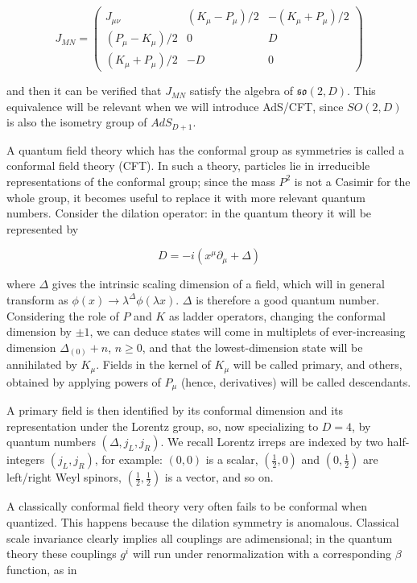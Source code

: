 \begin{equation}
	J_{MN} = 
	\begin{pmatrix}
		J_{\mu\nu} 		& (K_\mu - P_\mu)/2	& - (K_\mu+P_\mu)/2 \\
		(P_\mu - K_\mu)/2	& 0			& D \\
		(K_\mu+P_\mu)/2		& -D			& 0
	\end{pmatrix}
	\label{}
\end{equation}

and then it can be verified that $J_{MN}$ satisfy the algebra of $\mathfrak{so}(2,D)$. This equivalence will be relevant when we will introduce AdS/CFT, since $SO(2,D)$ is also the isometry group of $AdS_{D+1}$.

A quantum field theory which has the conformal group as symmetries is called a conformal field theory (CFT). In such a theory, particles lie in irreducible representations of the conformal group; since the mass $P^2$ is not a Casimir for the whole group, it becomes useful to replace it with more relevant quantum numbers. Consider the dilation operator: in the quantum theory it will be represented by

\begin{equation}
	D = -i (x^\mu\partial_\mu + \Delta)
	\label{}
\end{equation}

where $\Delta$ gives the intrinsic scaling dimension of a field, which will in general transform as $\phi(x) \rightarrow \lambda^{\Delta} \phi(\lambda x)$. $\Delta$ is therefore a good quantum number. Considering the role of $P$ and $K$ as ladder operators, changing the conformal dimension by $\pm 1$, we can deduce states will come in multiplets of ever-increasing dimension $\Delta_{(0)} + n$, $n\geq 0$, and that the lowest-dimension state will be annihilated by $K_\mu$. Fields in the kernel of $K_\mu$ will be called primary, and others, obtained by applying powers of $P_\mu$ (hence, derivatives) will be called descendants.

A primary field is then identified by its conformal dimension and its representation under the Lorentz group, so, now specializing to $D=4$, by quantum numbers $(\Delta,j_L,j_R)$. We recall Lorentz irreps are indexed by two half-integers $(j_L,j_R)$, for example: $(0,0)$ is a scalar, $(\frac{1}{2},0)$ and $(0,\frac{1}{2})$ are left/right Weyl spinors, $(\frac{1}{2},\frac{1}{2})$ is a vector, and so on.

A classically conformal field theory very often fails to be conformal when quantized. This happens because the dilation symmetry is anomalous. Classical scale invariance clearly implies all couplings are adimensional; in the quantum theory these couplings $g^i$ will run under renormalization with a corresponding $\beta$ function, as in

